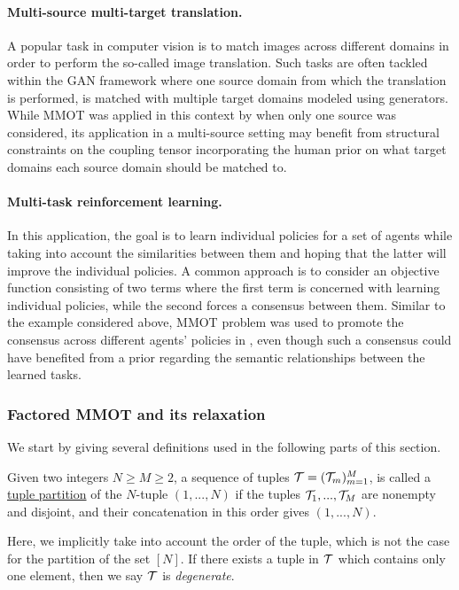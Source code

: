 \paragraph{Multi-source multi-target translation.} A popular task in computer vision is
to match images across different domains in order to perform the so-called image translation.
Such tasks are often tackled within the GAN framework where one source domain from which
the translation is performed, is matched with multiple target domains modeled using generators.
While MMOT was applied in this context by \citet{Cao19} when only one source was considered,
its application in a multi-source setting may benefit from structural constraints
on the coupling tensor incorporating the human prior on what target domains each source domain
should be matched to.

\paragraph{Multi-task reinforcement learning.} In this application, the goal is to learn
individual policies for a set of agents while taking into account the similarities between them
and hoping that the latter will improve the individual policies. A common approach is
to consider an objective function consisting of two terms where the first term is concerned
with learning individual policies, while the second forces a consensus between them.
Similar to the example considered above, MMOT problem was used to promote the consensus
across different agents' policies in \citep{Cohen21}, even though such a consensus
could have benefited from a prior regarding the semantic relationships between the learned tasks.
%

\subsubsection{Factored MMOT and its relaxation}
We start by giving several definitions used in the following parts of this section.
\begin{definition}
 Given two integers $N \geq M \geq 2$, a sequence of tuples $\mathcal T = (\mathcal T_m)_{m=1}^M$, is called a
 \underline{tuple partition} of the $N$-tuple $(1,...,N)$ if the tuples $\mathcal T_1, ..., \mathcal T_M$ are nonempty and disjoint,
 and their concatenation in this order gives $(1,...,N)$.
\end{definition}
Here, we implicitly take into account the order of the tuple, which is not the case for the partition of the set $[N]$. If
there exists a tuple in $\mathcal T$ which contains only one element, then we say $\mathcal T$ is \textit{degenerate}.

